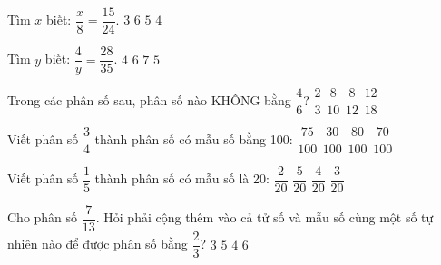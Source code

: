 \begin{ex} %
Tìm $x$ biết: $\dfrac{x}{8} = \dfrac{15}{24}$.
\choice
{$3$}
{$6$}
{\True $5$}
{$4$}
\end{ex}

\begin{ex} %
Tìm $y$ biết: $\dfrac{4}{y} = \dfrac{28}{35}$.
\choice
{$4$}
{$6$}
{$7$}
{\True $5$}
\end{ex}

\begin{ex} %
Trong các phân số sau, phân số nào KHÔNG bằng $\dfrac{4}{6}$?
\choice
{$\dfrac{2}{3}$}
{\True $\dfrac{8}{10}$}
{$\dfrac{8}{12}$}
{$\dfrac{12}{18}$}
\end{ex}

\begin{ex} %
Viết phân số $\dfrac{3}{4}$ thành phân số có mẫu số bằng 100:
\choice
{\True $\dfrac{75}{100}$}
{$\dfrac{30}{100}$}
{$\dfrac{80}{100}$}
{$\dfrac{70}{100}$}
\end{ex}

\begin{ex} %
Viết phân số $\dfrac{1}{5}$ thành phân số có mẫu số là 20:
\choice
{$\dfrac{2}{20}$}
{$\dfrac{5}{20}$}
{\True $\dfrac{4}{20}$}
{$\dfrac{3}{20}$}
\end{ex}

\begin{ex} %
Cho phân số $\dfrac{7}{13}$. Hỏi phải cộng thêm vào cả tử số và mẫu số cùng một số tự nhiên nào để được phân số bằng $\dfrac{2}{3}$?
\choice
{$3$}
{\True $5$}
{$4$}
{$6$}
\end{ex}

